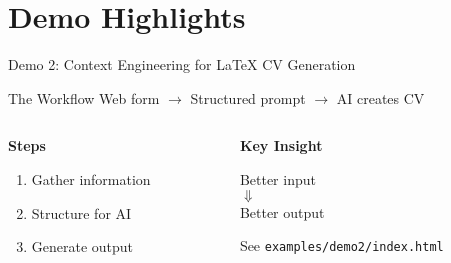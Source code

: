 \documentclass[aspectratio=169]{beamer}
\begin{document}
\section{Demo Highlights}

\begin{frame}{Demo 2: Context Engineering for LaTeX CV Generation}
  \begin{block}{The Workflow}
    Web form $\rightarrow$ Structured prompt $\rightarrow$ AI creates CV
  \end{block}

  \vspace{0.5cm}

  \begin{columns}[T]
    \begin{column}{0.48\textwidth}
      \centering
      \large\bfseries
      \textcolor{conesaTeal}{Steps}

      \vspace{0.3cm}
      \normalsize

      \begin{enumerate}
        \item Gather information
        \item Structure for AI
        \item Generate output
      \end{enumerate}
    \end{column}
    \begin{column}{0.48\textwidth}
      \centering
      \large\bfseries
      \textcolor{conesaOrange}{Key Insight}

      \vspace{0.3cm}
      \normalsize

      Better input\\
      $\Downarrow$\\
      Better output

      \vspace{0.3cm}
      \small
      See \texttt{examples/demo2/index.html}
    \end{column}
  \end{columns}
\end{frame}
\end{document}

